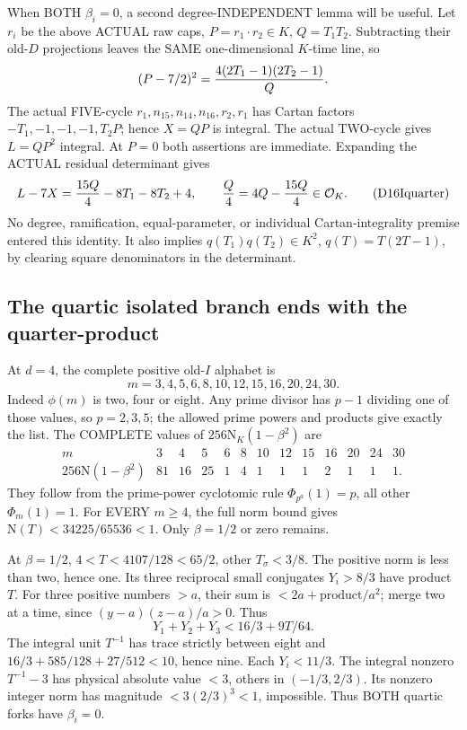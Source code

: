 When BOTH \(\beta_i=0\), a second
degree-INDEPENDENT lemma will be useful.
Let \(r_i\) be the above ACTUAL raw
caps, \(P=r_1\cdot r_2\in K\),
\(Q=T_1T_2\).
Subtracting their old-\(D\) projections
leaves the SAME one-dimensional
\(K\)-time line, so
\[
                   (P-7/2)^2=
                     {4(2T_1-1)(2T_2-1)\over Q}.
\]
The actual FIVE-cycle
\(r_1,n_{15},n_{14},n_{16},r_2,r_1\)
has Cartan factors
\(-T_1,-1,-1,-1,T_2P\);
hence \(X=QP\) is integral.
The actual TWO-cycle gives
\(L=QP^2\) integral.
At \(P=0\) both assertions are immediate.
Expanding the ACTUAL residual determinant
gives
\[
 L-7X={15Q\over4}-8T_1-8T_2+4,\qquad
          {Q\over4}=4Q-{15Q\over4}\in\mathcal O_K .
\tag{D16Iquarter}\label{eq:arithD16Iquarterproduct}
\]
No degree, ramification, equal-parameter,
or individual Cartan-integrality premise
entered this identity.
It also implies
\(q(T_1)q(T_2)\in K^2\),
\(q(T)=T(2T-1)\), by clearing square
denominators in the determinant.

\subsection{The quartic isolated branch ends with the quarter-product}
\label{app:arithD16Iquartic}

At \(d=4\), the complete positive
old-\(I\) alphabet is
\[
                m=3,4,5,6,8,10,12,15,16,20,24,30 .
\]
Indeed \(\phi(m)\) is two, four or
eight.
Any prime divisor has \(p-1\) dividing
one of those values, so \(p=2,3,5\);
the allowed prime powers and products
give exactly the list.
The COMPLETE values of
\(256\mathrm N_K(1-\beta^2)\)
are
\[
\begin{array}{c|rrrrrrrrrrrr}
m&3&4&5&6&8&10&12&15&16&20&24&30\\ \hline
256\mathrm N(1-\beta^2)&81&16&25&1&4&1&1&1&2&1&1&1 .
\end{array}
\]
They follow from the prime-power
cyclotomic rule \(\Phi_{p^a}(1)=p\),
all other \(\Phi_m(1)=1\).
For EVERY \(m\ge4\), the full norm
bound gives
\(\mathrm N(T)<34225/65536<1\).
Only \(\beta=1/2\) or zero remains.

At \(\beta=1/2\),
\(4<T<4107/128<65/2\), other
\(T_\sigma<3/8\).
The positive norm is less than two,
hence one.
Its three reciprocal small conjugates
\(Y_i>8/3\) have product \(T\).
For three positive numbers \(>a\),
their sum is \(<2a+\text{product}/a^2\);
merge two at a time, since
\((y-a)(z-a)/a>0\).
Thus
\[
                    Y_1+Y_2+Y_3<16/3+9T/64 .
\]
The integral unit \(T^{-1}\) has trace
strictly between eight and
\(16/3+585/128+27/512<10\), hence nine.
Each \(Y_i<11/3\).
The integral nonzero \(T^{-1}-3\)
has physical absolute value \(<3\),
others in \((-1/3,2/3)\).
Its nonzero integer norm has magnitude
\(<3(2/3)^3<1\), impossible.
Thus BOTH quartic forks have
\(\beta_i=0\).

